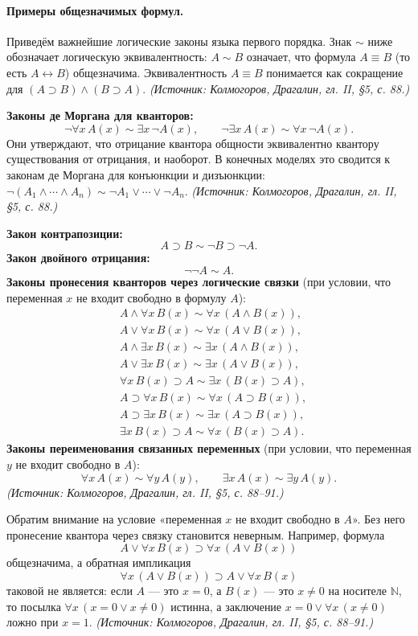 \documentclass[a4paper,12pt]{article}
\begin{document}
\paragraph{Примеры общезначимых формул.} Приведём важнейшие логические законы языка первого порядка. Знак \(\sim\) ниже обозначает логическую эквивалентность: \(A\sim B\) означает, что формула \(A\equiv B\) (то есть \(A\leftrightarrow B\)) общезначима. Эквивалентность \(A\equiv B\) понимается как сокращение для \((A\supset B)\wedge(B\supset A)\).
\textit{(Источник: Колмогоров, Драгалин, гл. II, §5, с. 88.)}

\textbf{Законы де Моргана для кванторов:}
\[
\neg\forall x\,A(x)\sim\exists x\,\neg A(x),\qquad
\neg\exists x\,A(x)\sim\forall x\,\neg A(x).
\]
Они утверждают, что отрицание квантора общности эквивалентно квантору существования от отрицания, и наоборот. В конечных моделях это сводится к законам де Моргана для конъюнкции и дизъюнкции: \(\neg(A_1\wedge\cdots\wedge A_n)\sim\neg A_1\vee\cdots\vee\neg A_n\).
\textit{(Источник: Колмогоров, Драгалин, гл. II, §5, с. 88.)}

\textbf{Закон контрапозиции:}
\[
A\supset B\sim\neg B\supset\neg A.
\]
\textbf{Закон двойного отрицания:}
\[
\neg\neg A\sim A.
\]
\textbf{Законы пронесения кванторов через логические связки} (при условии, что переменная \(x\) не входит свободно в формулу \(A\)):
\[
\begin{aligned}
&A\wedge\forall x\,B(x)\sim\forall x\,(A\wedge B(x)),\\
&A\vee\forall x\,B(x)\sim\forall x\,(A\vee B(x)),\\
&A\wedge\exists x\,B(x)\sim\exists x\,(A\wedge B(x)),\\
&A\vee\exists x\,B(x)\sim\exists x\,(A\vee B(x)),\\
&\forall x\,B(x)\supset A\sim\exists x\,(B(x)\supset A),\\
&A\supset\forall x\,B(x)\sim\forall x\,(A\supset B(x)),\\
&A\supset\exists x\,B(x)\sim\exists x\,(A\supset B(x)),\\
&\exists x\,B(x)\supset A\sim\forall x\,(B(x)\supset A).
\end{aligned}
\]
\textbf{Законы переименования связанных переменных} (при условии, что переменная \(y\) не входит свободно в \(A\)):
\[
\forall x\,A(x)\sim\forall y\,A(y),\qquad
\exists x\,A(x)\sim\exists y\,A(y).
\]
\textit{(Источник: Колмогоров, Драгалин, гл. II, §5, с. 88--91.)}

Обратим внимание на условие «переменная \(x\) не входит свободно в \(A\)». Без него пронесение квантора через связку становится неверным. Например, формула
\[
A\vee\forall x\,B(x)\supset\forall x\,(A\vee B(x))
\]
общезначима, а обратная импликация
\[
\forall x\,(A\vee B(x))\supset A\vee\forall x\,B(x)
\]
таковой не является: если \(A\) — это \(x=0\), а \(B(x)\) — это \(x\neq 0\) на носителе \(\mathbb{N}\), то посылка \(\forall x\,(x=0\vee x\neq 0)\) истинна, а заключение \(x=0\vee\forall x\,(x\neq 0)\) ложно при \(x=1\).
\textit{(Источник: Колмогоров, Драгалин, гл. II, §5, с. 88--91.)}
\end{document}
